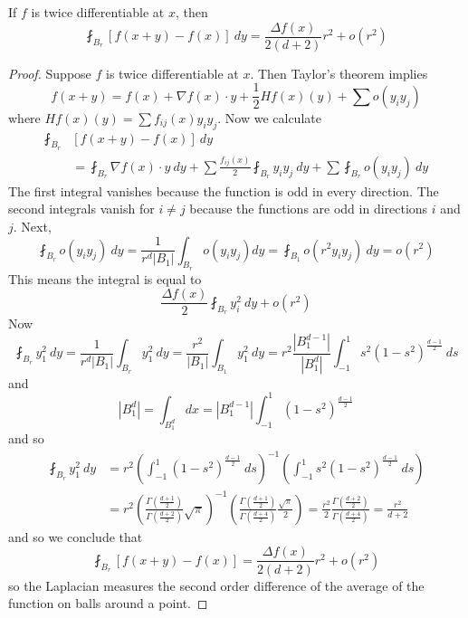 \begin{theorem}
    If $f$ is twice differentiable at $x$, then
    \[ \fint_{B_r} [f(x+y) - f(x)]\ dy = \frac{\Delta f(x)}{2(d+2)} r^2 + o(r^2) \]
\end{theorem}
\begin{proof}
    Suppose $f$ is twice differentiable at $x$. Then Taylor's theorem implies
    \[ f(x + y) = f(x) + \nabla f(x) \cdot y + \frac{1}{2} Hf(x)(y) + \sum o(y_iy_j) \]
    where $Hf(x)(y) = \sum f_{ij}(x) y_iy_j$. Now we calculate
    \begin{align*}
        \fint_{B_r} &[f(x + y) - f(x)]\ dy\\
        &= \fint_{B_r} \nabla f(x) \cdot y\ dy + \sum \frac{f_{ij}(x)}{2} \fint_{B_r} y_iy_j\ dy + \sum \fint_{B_r} o(y_iy_j)\ dy
    \end{align*}
    The first integral vanishes because the function is odd in every direction. The second integrals vanish for $i \neq j$ because the functions are odd in directions $i$ and $j$. Next,
    \[ \fint_{B_r} o(y_iy_j)\ dy = \frac{1}{r^d |B_1|} \int_{B_r} o(y_iy_j) dy = \fint_{B_1} o(r^2 y_iy_j)\ dy = o(r^2) \]
    This means the integral is equal to
    \[ \frac{\Delta f(x)}{2} \fint_{B_r} y_i^2\ dy + o(r^2) \]
    Now
    \[ \fint_{B_r} y_1^2\ dy = \frac{1}{r^d |B_1|} \int_{B_r} y_1^2\ dy = \frac{r^2}{|B_1|} \int_{B_1} y_1^2\ dy = r^2 \frac{|B_1^{d-1}|}{|B_1^d|} \int_{-1}^1 s^2 (1 - s^2)^{\frac{d-1}{2}}\ ds \]
    and
    \[ |B_1^d| = \int_{B_1^d} dx = |B_1^{d-1}| \int_{-1}^1 (1 - s^2)^{\frac{d-1}{2}} \]
    and so
    \begin{align*}
        \fint_{B_r} y_1^2\ dy &= r^2 \left( \int_{-1}^1 (1 - s^2)^{\frac{d-1}{2}}\ ds \right)^{-1} \left( \int_{-1}^1 s^2 (1 - s^2)^{\frac{d-1}{2}}\ ds \right)\\
        &= r^2 \left( \frac{\Gamma( \frac{d+1}{2} )}{\Gamma ( \frac{d + 2}{2} )} \sqrt{\pi} \right)^{-1} \left( \frac{\Gamma( \frac{d+1}{2} )}{\Gamma( \frac{d + 4}{2} )} \frac{\sqrt{\pi}}{2} \right) = \frac{r^2}{2} \frac{\Gamma( \frac{d+2}{2})}{\Gamma( \frac{d+4}{2} )} = \frac{r^2}{d + 2}
    \end{align*}
    and so we conclude that
    \[ \fint_{B_r} [f(x+y) - f(x)] = \frac{\Delta f(x)}{2(d+2)} r^2 + o(r^2) \]
    so the Laplacian measures the second order difference of the average of the function on balls around a point.
\end{proof}

